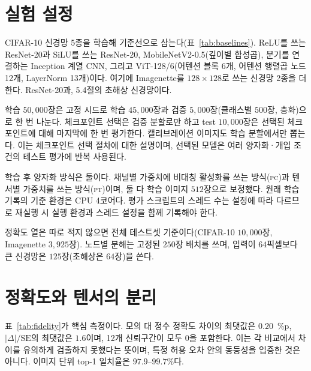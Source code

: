 \documentclass[11pt,a4paper,oneside]{report}
\newcommand{\fittable}[1]{\adjustbox{max width=\textwidth}{#1}}
\begin{document}
\section{실험 설정}

CIFAR-10 신경망 5종을 학습해 기준선으로 삼는다(표~\ref{tab:baselines}). ReLU를 쓰는 ResNet-20과 SiLU를 쓰는
ResNet-20, MobileNetV2-0.5(깊이별 합성곱), 분기를 연결하는 Inception 계열 CNN, 그리고 ViT-128/6(어텐션 블록
6개, 어텐션 행렬곱 노드 12개, LayerNorm 13개)이다. 여기에 Imagenette를 $128\times128$로 쓰는 신경망 2종을 더한다. ResNet-20과,
5.4절의 초해상 신경망이다.

학습 $50{,}000$장은 고정 시드로 학습 $45{,}000$장과 검증 $5{,}000$장(클래스별 $500$장, 층화)으로 한 번
나눈다. 체크포인트 선택은 검증 분할로만 하고 test $10{,}000$장은 선택된 체크포인트에 대해 마지막에 한 번
평가한다. 캘리브레이션 이미지도 학습 분할에서만 뽑는다. 이는 체크포인트 선택 절차에 대한 설명이며,
선택된 모델은 여러 양자화·개입 조건의 테스트 평가에 반복 사용된다.

학습 후 양자화 방식은 둘이다. 채널별 가중치에 비대칭 활성화를 쓰는 방식(\textsc{pc})과 텐서별 가중치를
쓰는 방식(\textsc{pt})이며, 둘 다 학습 이미지 $512$장으로 보정했다. 원래 학습 기록의 기준 환경은 CPU 4코어다. 평가 스크립트의 스레드 수는
설정에 따라 다르므로 재실행 시 실행 환경과 스레드 설정을 함께 기록해야 한다.

\begin{table}[!t]
\caption[CIFAR-10 기준선]{CIFAR-10 기준선. 사이클과 배열 활용률은 가상 NPU 비용 모델(\texttt{tiny-1tops} 스펙)의 값이므로
측정값이 아니라 추정값이다. lint 점수는 NPU 준비도 정적 분석의 종합 점수다.}
\label{tab:baselines}
\centering
\small
\fittable{}
\end{table}

정확도 열은 따로 적지 않으면 전체 테스트셋 기준이다(CIFAR-10 $10{,}000$장, Imagenette $3{,}925$장).
노드별 분해는 고정된 $250$장 배치를 쓰며, 입력이 $64$픽셀보다 큰 신경망은 $125$장(초해상은 $64$장)을
쓴다.

\section{정확도와 텐서의 분리}

표~\ref{tab:fidelity}가 핵심 측정이다. 모의 대 정수 정확도 차이의 최댓값은 $0.20$~\%p,
$|\Delta|/\mathrm{SE}$의 최댓값은 $1.6$이며, 12개 신뢰구간이 모두 0을 포함한다. 이는 각 비교에서 차이를 유의하게 검출하지 못했다는 뜻이며,
특정 허용 오차 안의 동등성을 입증한 것은 아니다. 이미지 단위 top-1 일치율은 $97.9$--$99.7\%$다.
\end{document}
